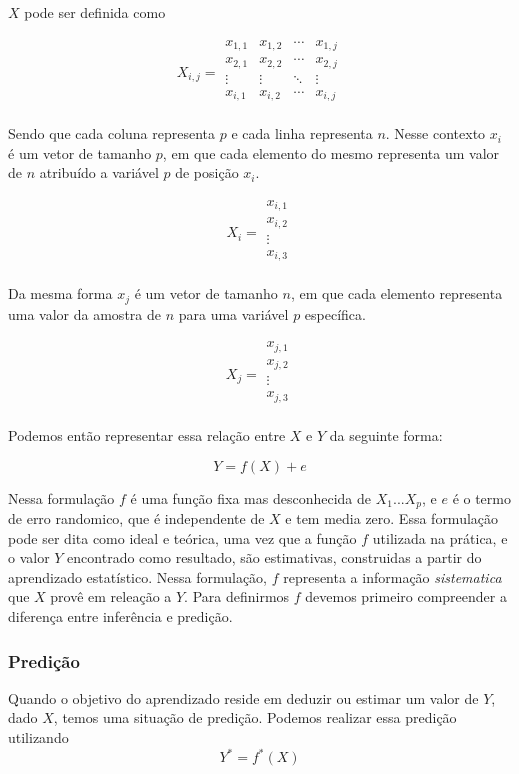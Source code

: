 $X$ pode ser definida como

\[
X_{i,j} = \begin{matrix}
x_{1,1} & x_{1,2} & \cdots & x_{1,j} \\
x_{2,1} & x_{2,2} & \cdots & x_{2,j} \\
\vdots  & \vdots  & \ddots & \vdots  \\
x_{i,1} & x_{i,2} & \cdots & x_{i,j} \\
\end{matrix}
\]

Sendo que cada coluna representa $p$ e cada linha representa $n$. Nesse contexto $x_i$ é um vetor de tamanho $p$, em que cada elemento do mesmo representa
um valor de $n$ atribuído a variável $p$ de posição $x_i$.

\[
X_{i} = \begin{matrix}
x_{i,1} \\
x_{i,2} \\
\vdots  \\
x_{i,3} \\
\end{matrix}
\]

Da mesma forma $x_j$ é um vetor de tamanho $n$, em que cada elemento representa uma valor da amostra de $n$ para uma variável $p$ específica.

\[
X_{j} = \begin{matrix}
x_{j,1} \\
x_{j,2} \\
\vdots  \\
x_{j,3} \\
\end{matrix}
\]

Podemos então representar essa relação entre $X$ e $Y$ da seguinte forma:

\[
  Y = f(X) + e
\]

Nessa formulação $f$ é uma função fixa mas desconhecida de $X_1...X_p$, e $e$ é o termo de erro randomico, que é independente de $X$ e tem media zero. Essa formulação pode ser dita
como ideal e teórica, uma vez que a função $f$ utilizada na prática, e o valor $Y$ encontrado como resultado, são estimativas, construidas a partir do aprendizado estatístico.
Nessa formulação, $f$ representa a informação \textit{sistematica} que $X$ provê em releação a $Y$\cite{Jordan}.
Para definirmos $f$ devemos primeiro compreender a diferença entre inferência e predição.
\subsubsection{Predição}
Quando o objetivo do aprendizado reside em deduzir ou estimar um valor de $Y$, dado $X$, temos uma situação de predição. Podemos realizar essa predição utilizando
\[
  Y^* = f^*(X)
\]

